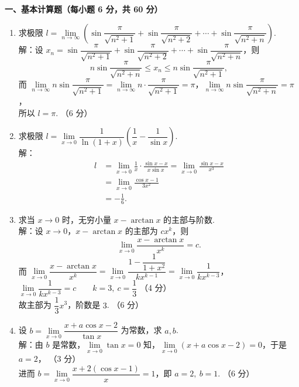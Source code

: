 \documentclass[a4paper,11pt]{ctexart}
\newcommand{\score}[1]{\hfill（#1）}
\begin{document}
\vspace{0.6em}

\textbf{一、基本计算题（每小题 6 分，共 60 分）}

\begin{enumerate}[label=\arabic*., leftmargin=2em, itemsep=1.0em, topsep=0.5em]
  \item 求极限 $l = \lim\limits_{n\to\infty}\left(\sin\dfrac{\pi}{\sqrt{n^2+1}} + \sin\dfrac{\pi}{\sqrt{n^2+2}} + \cdots + \sin\dfrac{\pi}{\sqrt{n^2+n}}\right)$.\\[0.3em]
  解：设 $x_n = \sin\dfrac{\pi}{\sqrt{n^2+1}} + \sin\dfrac{\pi}{\sqrt{n^2+2}} + \cdots + \sin\dfrac{\pi}{\sqrt{n^2+n}}$，则
  \[
    n\sin\frac{\pi}{\sqrt{n^2+n}} \le x_n \le n\sin\frac{\pi}{\sqrt{n^2+1}}, \tag*{（3 分）}
  \]
  而 $\lim\limits_{n\to\infty} n\sin\dfrac{\pi}{\sqrt{n^2+1}} = \lim\limits_{n\to\infty} n\cdot\dfrac{\pi}{\sqrt{n^2+1}} = \pi$，$\lim\limits_{n\to\infty} n\sin\dfrac{\pi}{\sqrt{n^2+n}} = \pi$，\\[0.2em]
  所以 $l = \pi$. \score{6 分}

  \item 求极限 $l = \lim\limits_{x\to 0}\dfrac{1}{\ln(1+x)}\left(\dfrac{1}{x} - \dfrac{1}{\sin x}\right)$.\\[0.3em]
  解：
  \vspace{-1.8em}
  \begin{align*}
    l &= \lim_{x\to 0}\frac{1}{x}\cdot\frac{\sin x - x}{x\sin x} = \lim_{x\to 0}\frac{\sin x - x}{x^3} \tag*{（3 分）} \\
      &= \lim_{x\to 0}\frac{\cos x - 1}{3x^2} \tag*{（5 分）} \\
      &= -\frac{1}{6}. \tag*{（6 分）}
  \end{align*}

  \item 求当 $x\to 0$ 时，无穷小量 $x - \arctan x$ 的主部与阶数.\\[0.3em]
  解：设 $x\to 0$，$x - \arctan x$ 的主部为 $cx^k$，则
  \[
    \lim_{x\to 0}\frac{x - \arctan x}{x^k} = c. \tag*{（2 分）}
  \]
  而 $\lim\limits_{x\to 0}\dfrac{x - \arctan x}{x^k} = \lim\limits_{x\to 0}\dfrac{1 - \dfrac{1}{1+x^2}}{kx^{k-1}} = \lim\limits_{x\to 0}\dfrac{1}{kx^{k-3}}$，\\[0.3em]
  $\lim\limits_{x\to 0}\dfrac{1}{kx^{k-3}} = c \qquad k = 3,\ c = \dfrac{1}{3}$ \score{4 分}\\[0.2em]
  故主部为 $\dfrac{1}{3}x^3$，阶数是 $3$. \score{6 分}

  \item 设 $b = \lim\limits_{x\to 0}\dfrac{x + a\cos x - 2}{\tan x}$ 为常数，求 $a, b$.\\[0.3em]
  解：由 $b$ 是常数，$\lim\limits_{x\to 0}\tan x = 0$ 知，$\lim\limits_{x\to 0}(x + a\cos x - 2) = 0$，于是 $a = 2$， \score{3 分}\\[0.2em]
  进而 $b = \lim\limits_{x\to 0}\dfrac{x + 2(\cos x - 1)}{x} = 1$，即 $a = 2,\ b = 1$. \score{6 分}


\end{enumerate}
\end{document}
